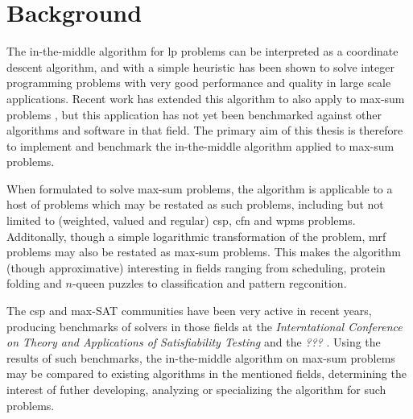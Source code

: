 \section{Background}
The in-the-middle algorithm \parencite{Wedelin95} for \acrlong{lp} problems can be interpreted as a coordinate descent algorithm, and with a simple heuristic has been shown to solve integer programming problems with very good performance and quality in large scale applications.
Recent work has extended this algorithm to also apply to max-sum problems \parencite{Wedelin13}, but this application has not yet been benchmarked against other algorithms and software in that field.
The primary aim of this thesis is therefore to implement and benchmark the in-the-middle algorithm applied to max-sum problems.

When formulated to solve max-sum problems, the algorithm is applicable to a host of problems which may be restated as such problems, including but not limited to (weighted, valued and regular) \gls{csp}, \gls{cfn} and \gls{wpms} problems.
Additonally, though a simple logarithmic transformation of the problem, \gls{mrf} problems may also be restated as max-sum problems.
This makes the algorithm (though approximative) interesting in fields ranging from scheduling, protein folding and \(n\)-queen puzzles to classification and pattern regconition.

The \gls{csp} and max-SAT communities have been very active in recent years, producing benchmarks of solvers in those fields at the \emph{Interntational Conference on Theory and Applications of Satisfiability Testing} \parencite{Argelich11} and the \emph{???} \parencites{Allouche14}{deGivry14}.
Using the results of such benchmarks, the in-the-middle algorithm on max-sum problems may be compared to existing algorithms in the mentioned fields, determining the interest of futher developing, analyzing or specializing the algorithm for such problems.
